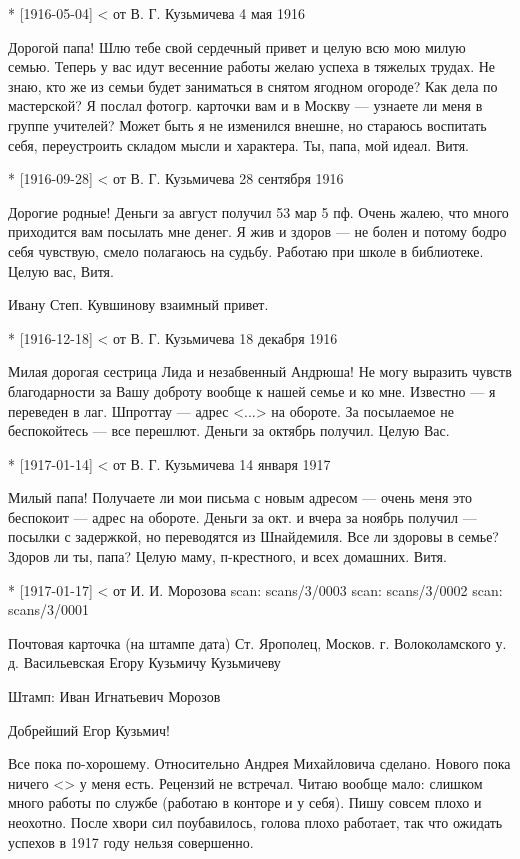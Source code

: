 \documentclass[]{memoir}
\begin{document}
* [1916-05-04] < от В. Г. Кузьмичева 
4 мая 1916

Дорогой папа! Шлю тебе свой сердечный привет и целую всю мою милую семью. Теперь у вас идут весенние работы желаю успеха в тяжелых трудах. Не знаю, кто же из семьи будет заниматься в снятом ягодном огороде? Как дела по мастерской? Я послал фотогр. карточки вам и в Москву — узнаете ли меня в группе учителей? Может быть я не изменился внешне, но стараюсь воспитать себя, переустроить складом мысли и характера. Ты, папа, мой идеал. Витя.


* [1916-09-28] < от В. Г. Кузьмичева 
28 сентября 1916

Дорогие родные! Деньги за август получил 53 мар 5 пф. Очень жалею, что много приходится вам посылать мне денег. Я жив и здоров — не болен и потому бодро себя чувствую, смело полагаюсь на судьбу. Работаю при школе в библиотеке. Целую вас, Витя.

Ивану Степ. Кувшинову взаимный привет.

* [1916-12-18] < от В. Г. Кузьмичева 
18 декабря 1916

Милая дорогая сестрица Лида и незабвенный Андрюша! Не могу выразить чувств благодарности за Вашу доброту вообще к нашей семье и ко мне. Известно — я переведен в лаг. Шпроттау — адрес <...> на обороте. За посылаемое не беспокойтесь — все перешлют. Деньги за октябрь получил. Целую Вас.



* [1917-01-14] < от В. Г. Кузьмичева 
14 января 1917

Милый папа! Получаете ли мои письма с новым адресом — очень меня это беспокоит — адрес на обороте. Деньги за окт. и вчера за ноябрь получил — посылки с задержкой, но переводятся из Шнайдемиля. Все ли здоровы в семье? Здоров ли ты, папа? Целую маму, п-крестного, и всех домашних. Витя.


* [1917-01-17] < от И. И. Морозова
scan: scans/3/0003
scan: scans/3/0002
scan: scans/3/0001

Почтовая карточка (на штампе дата)
Ст. Ярополец, Москов. г. Волоколамского у. д. Васильевская
Егору Кузьмичу Кузьмичеву

Штамп: Иван Игнатьевич Морозов

Добрейший Егор Кузьмич!

Все пока по-хорошему. Относительно Андрея Михайловича сделано. Нового пока ничего <> у меня есть. Рецензий не встречал.
Читаю вообще мало: слишком много работы по службе (работаю в конторе и у себя). Пишу совсем плохо и неохотно. После хвори сил поубавилось, голова плохо работает, так что ожидать успехов в 1917 году нельзя совершенно.
\end{document}
